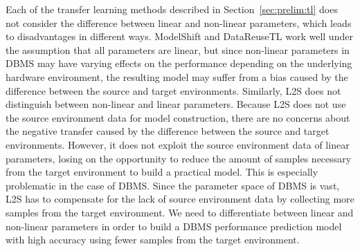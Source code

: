 Each of the transfer learning methods described in Section~\ref{sec:prelim:tl} does not consider the difference between linear and non-linear parameters, which leads to disadvantages in different ways.
ModelShift and DataReuseTL work well under the assumption that all parameters are linear, but since non-linear parameters in DBMS may have varying effects on the performance depending on the underlying hardware environment, the resulting model may suffer from a bias caused by the difference between the source and target environments.
Similarly, L2S does not distinguish between non-linear and linear parameters.
Because L2S does not use the source environment data for model construction, there are no concerns about the negative transfer caused by the difference between the source and target environments.
However, it does not exploit the source environment data of linear parameters, losing on the opportunity to reduce the amount of samples necessary from the target environment to build a practical model.
This is especially problematic in the case of DBMS. 
Since the parameter space of DBMS is vast, L2S has to compensate for the lack of source environment data by collecting more samples from the target environment.
We need to differentiate between linear and non-linear parameters in order to build a DBMS performance prediction model with high accuracy using fewer samples from the target environment.